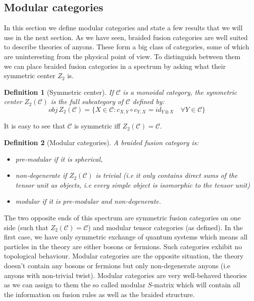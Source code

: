 \documentclass{article}
\newtheorem{definition}{Definition}
\newcommand{\cat}{\mathcal{C}}
\begin{document}
\subsection{Modular categories}\label{Modularcategories}
In this section we  define modular categories and state a few results that we will use in the next section. As we have seen, braided fusion categories are well suited to describe theories of anyons. These form a big class of categories, some of which are uninteresting from the physical point of view. To distinguish between them we can place braided fusion categories in a spectrum by asking what their symmetric center $Z_2$ is. 

\begin{definition}[Symmetric center]
	If $\cat$ is a monoidal category, the symmetric center $Z_2(\mathcal{C})$ is the full subcategory of $\mathcal{C}$ defined by:
	$$ obj \, Z_2(\mathcal{C}) = \{ X\in \mathcal{C} : c_{X,Y} \circ c_{Y,X} = id_{Y\otimes X} \quad \forall Y \in \mathcal{C} \} $$
\end{definition}
It is easy to see that $\cat$ is symmetric iff $Z_2(\cat)=\cat$.
\begin{definition}[Modular categories]
	A braided fusion category is:
	\begin{itemize}
		\item pre-modular if it is spherical,
		\item non-degenerate if $Z_2(\mathcal{C})$ is trivial (i.e it only contains direct sums of the tensor unit as objects, i.e every simple object is isomorphic to the tensor unit)
		\item modular if it is pre-modular and non-degenerate.
	\end{itemize}
\end{definition}
The two opposite ends of this spectrum are symmetric fusion categories on one side (such that $Z_2(\mathcal{C})=\mathcal{C}$) and modular tensor categories (as defined). 
In the first case, we have only symmetric exchange of quantum systems which means all particles in the theory are either bosons or fermions. Such categories exhibit no topological behaviour. Modular categories are the opposite situation, the theory doesn't contain any bosons or fermions but only non-degenerate anyons (i.e anyons with non-trivial twist). Modular categories are very well-behaved theories as we can assign to them the so called modular $S$-matrix which will contain all the information on fusion rules as well as the braided structure.
\end{document}
